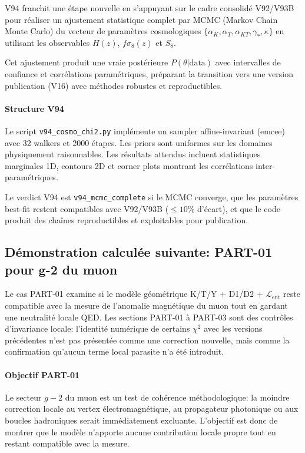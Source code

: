 \documentclass[11pt,a4paper]{article}
\newcommand{\kent}{\kappa} %
\newcommand{\Lent}{\mathcal{L}_{\mathrm{ent}}}
\begin{document}
V94 franchit une étape nouvelle en s'appuyant sur le cadre consolidé V92/V93B pour réaliser un ajustement statistique complet par MCMC (Markov Chain Monte Carlo) du vecteur de paramètres cosmologiques $\{\alpha_K, \alpha_T, \alpha_{KT}, \gamma_*, \kent\}$ en utilisant les observables $H(z)$, $f\sigma_8(z)$ et $S_8$.

Cet ajustement produit une vraie postérieure $P(\theta | \text{data})$ avec intervalles de confiance et corrélations paramétriques, préparant la transition vers une version publication (V16) avec méthodes robustes et reproductibles.

\paragraph{Structure V94}
Le script \texttt{v94\_cosmo\_chi2.py} implémente un sampler affine-invariant (emcee) avec 32 walkers et 2000 étapes. Les priors sont uniformes sur les domaines physiquement raisonnables. Les résultats attendus incluent statistiques marginales 1D, contours 2D et corner plots montrant les corrélations inter-paramétriques.

Le verdict V94 est \texttt{v94\_mcmc\_complete} si le MCMC converge, que les paramètres best-fit restent compatibles avec V92/V93B ($\leq 10\%$ d'écart), et que le code produit des chaînes reproductibles et exploitables pour publication.

\subsection{Démonstration calculée suivante: PART-01 pour g-2 du muon}
Le cas PART-01 examine si le modèle géométrique K/T/Y + D1/D2 + $\Lent$ reste compatible avec la mesure de l'anomalie magnétique du muon tout en gardant une neutralité locale QED.
Les sections PART-01 à PART-03 sont des contrôles d'invariance locale: l'identité numérique de certains $\chi^2$ avec les versions précédentes n'est pas présentée comme une correction nouvelle, mais comme la confirmation qu'aucun terme local parasite n'a été introduit.

\paragraph{Objectif PART-01}
Le secteur $g-2$ du muon est un test de cohérence méthodologique: la moindre correction locale au vertex électromagnétique, au propagateur photonique ou aux boucles hadroniques serait immédiatement excluante. L'objectif est donc de montrer que le modèle n'apporte aucune contribution locale propre tout en restant compatible avec la mesure.
\end{document}
